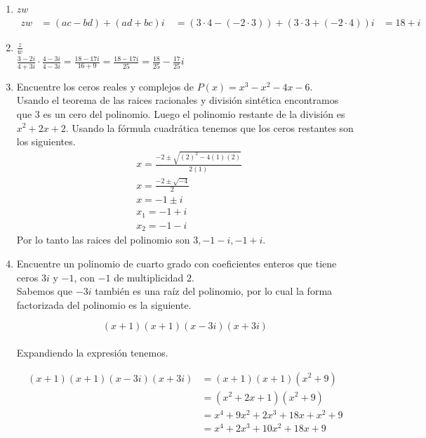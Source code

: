\documentclass{report}
\begin{document}
        \begin{enumerate}
            \item $zw$
                \begin{align*}
                    zw &= (ac - bd) + (ad + bc)i\
                    &= (3 \cdot 4 - (-2 \cdot 3)) + (3 \cdot 3 + (-2 \cdot 4))i
                    &= 18 + i
                \end{align*}
            \item $\frac{z}{w}$\\
                $\frac{3-2i}{4+3i} \cdot \frac{4-3i}{4-3i} = \frac{18-17i}{16 + 9} = \frac{18-17i}{25} = \frac{18}{25} - \frac{17}{25}i$
            \item Encuentre los ceros reales y complejos de $P(x) = x^3 - x^2 -4x -6$.\\
                Usando el teorema de las raices racionales y división sintética encontramos que $3$ es un cero del polinomio. Luego el polinomio restante de la división es $x^2 + 2x +2$. Usando la fórmula cuadrática tenemos que los ceros restantes son los siguientes.
                \begin{align*}
                    & x=\frac{-2\pm\sqrt{(2)^2-4(1)(2)}}{2(1)} \\
                    & x=\frac{-2\pm\sqrt{-4}}{2} \\
                    & x=-1\pm i \\
                    & x_1=-1+i \\
                    & x_2=-1-i
                \end{align*}
                Por lo tanto las raices del polinomio son $3, -1 -i, -1 +i$.

            \item Encuentre un polinomio de cuarto grado con coeficientes enteros que tiene ceros $3i$ y $-1$, con $-1$ de multiplicidad $2$.\\
                Sabemos que $-3i$ también es una raíz del polinomio, por lo cual la forma factorizada del polinomio es la siguiente.

                $$ (x+1)(x+1)(x-3i)(x+3i) $$\\

                Expandiendo la expresión tenemos.

                \begin{align*}
                    (x+1)(x+1)(x-3i)(x+3i) &= (x+1)(x+1)(x^2+9) \\
                    &= (x^2+2x+1)(x^2+9) \\
                    &= x^4+9x^2+2x^3+18x+x^2+9 \\
                    &= x^4+2x^3+10x^2+18x+9
                \end{align*}
        \end{enumerate}
\end{document}
